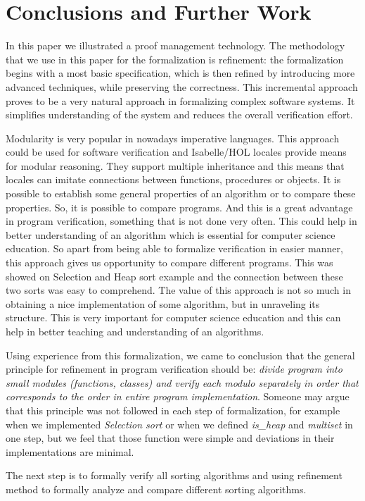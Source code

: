\documentclass[11pt,a4paper]{article}
\begin{document}
\section{Conclusions and Further Work}
\label{sec:conclusion}

In this paper we illustrated a proof management technology. The
methodology that we use in this paper for the formalization is
refinement: the formalization begins with a most basic specification,
which is then refined by introducing more advanced techniques, while
preserving the correctness. This incremental approach proves to be a
very natural approach in formalizing complex software systems. It
simplifies understanding of the system and reduces the overall
verification effort.

Modularity is very popular in nowadays imperative languages. This
approach could be used for software verification and Isabelle/HOL
locales provide means for modular reasoning. They support multiple
inheritance and this means that locales can imitate connections
between functions, procedures or objects. It is possible to establish
some general properties of an algorithm or to compare these
properties. So, it is possible to compare programs. And this is a
great advantage in program verification, something that is not done
very often. This could help in better understanding of an algorithm
which is essential for computer science education. So apart from being
able to formalize verification in easier manner, this approach gives
us opportunity to compare different programs. This was showed on
Selection and Heap sort example and the connection between these two
sorts was easy to comprehend. The value of this approach is not so
much in obtaining a nice implementation of some algorithm, but in
unraveling its structure. This is very important for computer science
education and this can help in better teaching and understanding of an
algorithms.

Using experience from this formalization, we came to conclusion that
the general principle for refinement in program verification should
be: {\em divide program into small modules (functions, classes) and
  verify each modulo separately in order that corresponds to the order
  in entire program implementation}. Someone may argue that this
principle was not followed in each step of formalization, for example
when we implemented {\em Selection sort} or when we defined {\em
  is\_heap} and {\em multiset} in one step, but we feel that those
function were simple and deviations in their implementations are
minimal.

The next step is to formally verify all sorting algorithms and using
refinement method to formally analyze and compare different sorting
algorithms.



\end{document}
